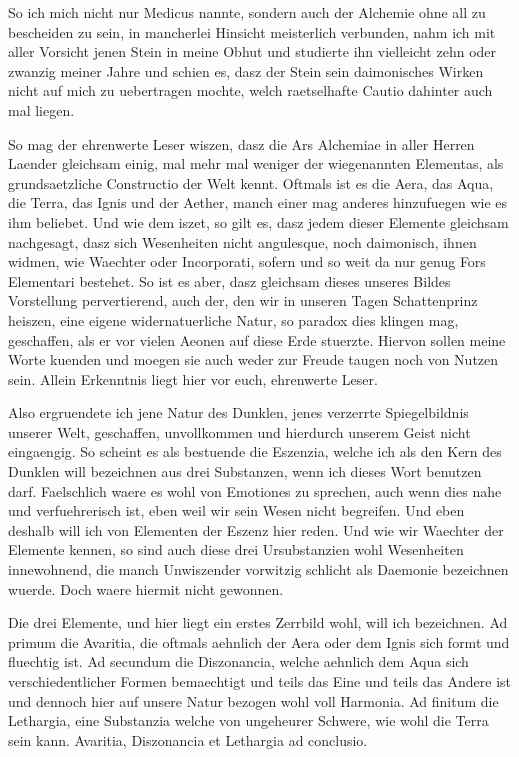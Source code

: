 \documentclass[a5paper,8pt]{book}
\begin{document}
So ich mich nicht nur Medicus nannte, sondern auch der Alchemie ohne all zu bescheiden zu sein, in mancherlei Hinsicht meisterlich verbunden, nahm ich mit aller Vorsicht jenen Stein in meine Obhut und studierte ihn vielleicht zehn oder zwanzig meiner Jahre und schien es, dasz der Stein sein daimonisches Wirken nicht auf mich zu uebertragen mochte, welch raetselhafte Cautio dahinter auch mal liegen.

So mag der ehrenwerte Leser wiszen, dasz die Ars Alchemiae in aller Herren Laender gleichsam einig, mal mehr mal weniger der wiegenannten Elementas, als grundsaetzliche Constructio der Welt kennt. Oftmals ist es die Aera, das Aqua, die Terra, das Ignis und der Aether, manch einer mag anderes hinzufuegen wie es ihm beliebet. Und wie dem iszet, so gilt es, dasz jedem dieser Elemente gleichsam nachgesagt, dasz sich Wesenheiten nicht angulesque, noch daimonisch, ihnen widmen, wie Waechter oder Incorporati, sofern und so weit da nur genug Fors Elementari bestehet.
So ist es aber, dasz gleichsam dieses unseres Bildes Vorstellung pervertierend, auch der, den wir in unseren Tagen Schattenprinz heiszen, eine eigene widernatuerliche Natur, so paradox dies klingen mag, geschaffen, als er vor vielen Aeonen auf diese Erde stuerzte. Hiervon sollen meine Worte kuenden und moegen sie auch weder zur Freude taugen noch von Nutzen sein. Allein Erkenntnis liegt hier vor euch, ehrenwerte Leser.

Also ergruendete ich jene Natur des Dunklen, jenes verzerrte Spiegelbildnis unserer Welt, geschaffen, unvollkommen und hierdurch unserem Geist nicht eingaengig. So scheint es als bestuende die Eszenzia, welche ich als den Kern des Dunklen will bezeichnen aus drei Substanzen, wenn ich dieses Wort benutzen darf. Faelschlich waere es wohl von Emotiones zu sprechen, auch wenn dies nahe und verfuehrerisch ist, eben weil wir sein Wesen nicht begreifen. Und eben deshalb will ich von Elementen der Eszenz hier reden.
Und wie wir Waechter der Elemente kennen, so sind auch diese drei Ursubstanzien wohl Wesenheiten innewohnend, die manch Unwiszender vorwitzig schlicht als Daemonie bezeichnen wuerde. Doch waere hiermit nicht gewonnen.

Die drei Elemente, und hier liegt ein erstes Zerrbild wohl, will ich bezeichnen. Ad primum die Avaritia, die oftmals aehnlich der Aera oder dem Ignis sich formt und fluechtig ist. Ad secundum die Diszonancia, welche aehnlich dem Aqua sich verschiedentlicher Formen bemaechtigt und teils das Eine und teils das Andere ist und dennoch hier auf unsere Natur bezogen wohl voll Harmonia. Ad finitum die Lethargia, eine Substanzia welche von ungeheurer Schwere, wie wohl die Terra sein kann. Avaritia, Diszonancia et Lethargia ad conclusio.
\end{document}
